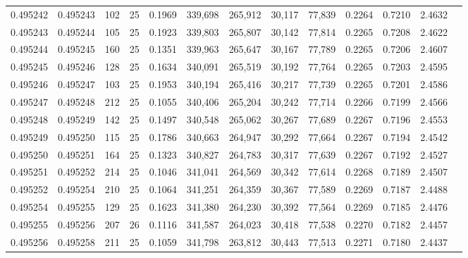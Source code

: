 \begin{tabular}{rrrrrrrrrrrrr}
0.495242 & 0.495243 &   102 &  25 &                                     0.1969 & 339,698 & 265,912 &  30,117 &  77,839 & 0.2264 & 0.7210 & 2.4632 \\
0.495243 & 0.495244 &   105 &  25 &                                     0.1923 & 339,803 & 265,807 &  30,142 &  77,814 & 0.2265 & 0.7208 & 2.4622 \\
0.495244 & 0.495245 &   160 &  25 &                                     0.1351 & 339,963 & 265,647 &  30,167 &  77,789 & 0.2265 & 0.7206 & 2.4607 \\
0.495245 & 0.495246 &   128 &  25 &                                     0.1634 & 340,091 & 265,519 &  30,192 &  77,764 & 0.2265 & 0.7203 & 2.4595 \\
0.495246 & 0.495247 &   103 &  25 &                                     0.1953 & 340,194 & 265,416 &  30,217 &  77,739 & 0.2265 & 0.7201 & 2.4586 \\
0.495247 & 0.495248 &   212 &  25 &                                     0.1055 & 340,406 & 265,204 &  30,242 &  77,714 & 0.2266 & 0.7199 & 2.4566 \\
0.495248 & 0.495249 &   142 &  25 &                                     0.1497 & 340,548 & 265,062 &  30,267 &  77,689 & 0.2267 & 0.7196 & 2.4553 \\
0.495249 & 0.495250 &   115 &  25 &                                     0.1786 & 340,663 & 264,947 &  30,292 &  77,664 & 0.2267 & 0.7194 & 2.4542 \\
0.495250 & 0.495251 &   164 &  25 &                                     0.1323 & 340,827 & 264,783 &  30,317 &  77,639 & 0.2267 & 0.7192 & 2.4527 \\
0.495251 & 0.495252 &   214 &  25 &                                     0.1046 & 341,041 & 264,569 &  30,342 &  77,614 & 0.2268 & 0.7189 & 2.4507 \\
0.495252 & 0.495254 &   210 &  25 &                                     0.1064 & 341,251 & 264,359 &  30,367 &  77,589 & 0.2269 & 0.7187 & 2.4488 \\
0.495254 & 0.495255 &   129 &  25 &                                     0.1623 & 341,380 & 264,230 &  30,392 &  77,564 & 0.2269 & 0.7185 & 2.4476 \\
0.495255 & 0.495256 &   207 &  26 &                                     0.1116 & 341,587 & 264,023 &  30,418 &  77,538 & 0.2270 & 0.7182 & 2.4457 \\
0.495256 & 0.495258 &   211 &  25 &                                     0.1059 & 341,798 & 263,812 &  30,443 &  77,513 & 0.2271 & 0.7180 & 2.4437 \\

\end{tabular}
